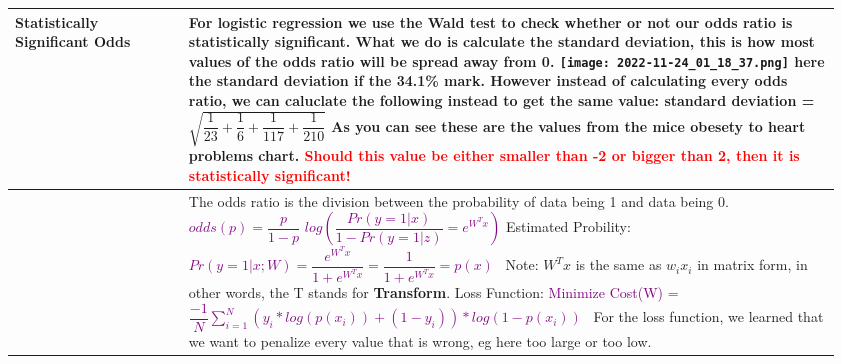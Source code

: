 \documentclass[main.tex,fontsize=8pt,paper=a4,paper=portrait,DIV=calc,]{scrartcl}
\begin{document}
\begin{table}[ht!]
\begin{tabular}{|m{0.2\linewidth}|m{0.755\linewidth}|}
\hline
Statistically Significant Odds & 
For logistic regression we use the \textbf{Wald test} to check whether or not our odds ratio is statistically significant.\newline
What we do is calculate the \textbf{standard deviation},  this is how most values of the \textbf{odds ratio} will be spread away from 0.\newline
\texttt{[image: 2022-11-24\_01\_18\_37.png]}\newline
here the standard deviation if the 34.1\% mark.\newline
However instead of calculating every odds ratio, we can caluclate the following instead to get the same value:\newline
\large standard deviation = \( \sqrt{\dfrac{1}{23} + \dfrac{1}{6} + \dfrac{1}{117} + \dfrac{1}{210}} \)\newline
\normalsize As you can see these are the values from the mice obesety to heart problems chart.\newline 
\textcolor{red}{Should this value be either \textbf{smaller than -2 or bigger than 2, then it is statistically significant!}}
\\
\hline
&
The odds ratio is the division between the probability of data being 1 and data being 0.\newline
\large \textcolor{purple}{\( odds(p) = \dfrac{p}{1-p} \)}\newline
\large \textcolor{purple}{\( log ( \dfrac{Pr(y=1|x)}{1-Pr(y=1|z)} = e^{W^{T}x} ) \)}\newline
Estimated Probility:\newline
\large \textcolor{purple}{\( Pr(y=1|x;W) = \dfrac{e^{W^T x}}{1+e^{W^T x}} = \dfrac{1}{1 + e^{W^T x}} = p(x) \)}\newline
\normalsize \, \newline
Note: \( W^T x \) is the same as \( w_ix_i \) in matrix form, in other words, the T stands for \textbf{Transform}.\newline
\large Loss Function:\newline
\textcolor{purple}{Minimize Cost(W) =\( \dfrac{-1}{N}\sum^{N}_{i=1}(y_i * log(p(x_i)) + (1-y_i)) * log(1 - p(x_i)) \) }\newline 
\normalsize \, \newline
For the loss function, we learned that we want to penalize every value that is wrong, eg here too large or too low.\newline

\end{tabular}
\end{table}
\end{document}
